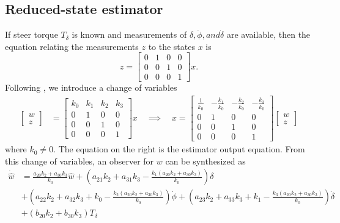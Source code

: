 \documentclass[letterpaper,11pt]{article}
\begin{document}
\subsection{Reduced-state estimator} \label{reducedstate}
If steer torque $T_\delta$ is known and measurements of $\delta,
\dot{\phi}, and \dot{\delta}$ are available, then the equation relating the measurements $z$ 
to the states $x$ is 
\begin{equation*}
z = \left[\begin{smallmatrix}0 & 1 & 0 & 0\\ 0 & 0 & 1 & 0\\ 0 & 0 & 0 &
1\end{smallmatrix}\right] x.
\end{equation*}
Following \cite{Bryson1970}, we introduce a change of variables
\begin{align}
\left[\begin{smallmatrix}w \\ z\end{smallmatrix}\right] &=
\left[\begin{smallmatrix}k_0 & k_1 & k_2 & k_3 \\ 0 & 1 & 0 & 0\\ 0 & 0 & 1 & 0\\ 0 & 0 & 0 &
1\end{smallmatrix}\right] x  \quad\implies\quad
x =
\left[\begin{smallmatrix}\frac{1}{k_{0}} & - \frac{k_{1}}{k_{0}} & -
  \frac{k_{2}}{k_{0}} & - \frac{k_{3}}{k_{0}}\\0 & 1 & 0 & 0\\0 & 0 & 1 & 0\\0
  & 0 & 0 & 1\end{smallmatrix}\right]\left[\begin{smallmatrix} w \\ z\end{smallmatrix}\right]
\label{eq:cov}
\end{align}
where $k_0\ne0$. The equation on the right is the estimator output equation.
From this change of variables, an observer for $w$ can be synthesized as
\begin{align*}
\dot{\hat{w}} &= \frac{a_{20} k_{2} + a_{30} k_{3}}{k_{0}} \hat{w}
 + \left(a_{21} k_{2} + a_{31} k_{3} - \frac{k_{1} \left(a_{20} k_{2} + a_{30} k_{3}\right)}{k_{0}}\right) \delta \\
 &+ \left(a_{22} k_{2} + a_{32} k_{3} + k_{0} - \frac{k_{2} \left(a_{20} k_{2} + a_{30} k_{3}\right)}{k_{0}}\right) \dot{\phi}
 + \left(a_{23} k_{2} + a_{33} k_{3} + k_{1} - \frac{k_{3} \left(a_{20} k_{2} + a_{30} k_{3}\right)}{k_{0}}\right) \dot{\delta} \\
 &+ \left(b_{20} k_{2} + b_{30} k_{3}\right) T_\delta
\end{align*}
\end{document}
